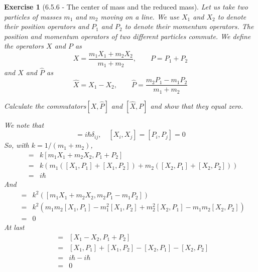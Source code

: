 \documentclass[12pt]{article}
\def\be{\begin{equation}}
\def\ee{\end{equation}}
\def\bea{\begin{eqnarray*}}
\def\eea{\end{eqnarray*}}
\def\f{\frac}
\def\l{\left}
\def\r{\right}
\newtheorem{exercise}{Exercise}
\begin{document}
	\begin{exercise}[6.5.6 -  The center of mass and the reduced mass]
		Let us take two particles of masses $m_1$ and $m_2$ moving on a line. We use $X_1$ and $X_2$ to denote their position operators and $P_1$ and $P_2$ to denote their momentum operators. The position and momentum operators of two different particles commute. We define the operators $X$ and $P$ as
		\be
			X = \f{m_1X_1 + m_2X_2}{m_1+m_2}, \quad\quad P = P_1 + P_2
		\ee
		and $\hat{X}$ and $\hat{P}$ as
		\be
			\hat{X} = X_1 - X_2, \quad\quad \hat{P} = \f{m_2P_1 - m_1P_2}{m_1 + m_2}
		\ee
		\begin{exercises}
			\item Calculate the commutators$[X, \hat{P}]$ and $[\hat{X}, P]$ and show that they equal zero.
			\begin{multianswer}
				We note that
				\be
					[X_i, P_j] = i\hbar \delta_{ij}, \quad [X_i, X_j] = [P_i, P_j] = 0
				\ee
				So, with $k=1/(m_1+m_2)$,
				\bea
					[X, P] &=& k [m_1X_1 + m_2X_2, P_1 + P_2] \\
						&=& k\l( m_1( [X_1, P_1] + [X_1, P_2]) + m_2 ([X_2, P_1] + [X_2, P_2]) \r) \\
						&=& i\hbar
				\eea
				And
				\bea
					[X, \hat{P}] &=& k^2 \l( [m_1X_1 + m_2X_2, m_2P_1 - m_1P_2] \r) \\
						&=& k^2 \l( m_1m_2[X_1, P_1] - m_1^2[X_1, P_2] + m_2^2[X_2, P_1] - m_1m_2[X_2, P_2] \r) \\
						&=& 0 
				\eea
				At last
				\bea
					[\hat{X}, P] &=& [X_1 - X_2, P_1 + P_2] \\
						&=& [X_1, P_1] + [X_1, P_2] - [X_2, P_1] - [X_2, P_2] \\
						&=& i\hbar - i\hbar \\
						&=& 0 
				\eea
			\end{multianswer}
			

\end{exercises}
\end{exercise}
\end{document}
